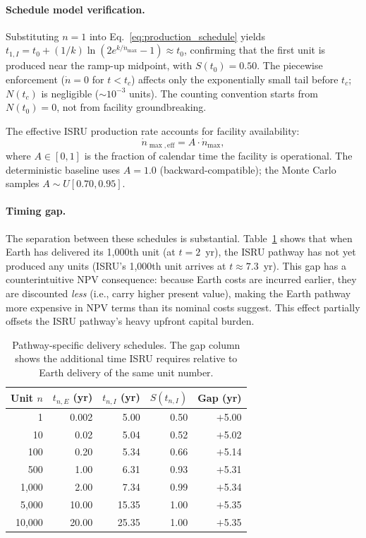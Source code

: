 \documentclass[preprint,12pt]{elsarticle}
\begin{document}
\paragraph{Schedule model verification.} Substituting $n = 1$ into Eq.~\ref{eq:production_schedule} yields $t_{1,I} = t_0 + (1/k)\ln(2e^{k/\dot{n}_{\max}} - 1) \approx t_0$, confirming that the first unit is produced near the ramp-up midpoint, with $S(t_0) = 0.50$. The piecewise enforcement ($\dot{n} = 0$ for $t < t_c$) affects only the exponentially small tail before $t_c$; $N(t_c)$ is negligible (${\sim}10^{-3}$ units). The counting convention starts from $N(t_0) = 0$, not from facility groundbreaking.

The effective ISRU production rate accounts for facility availability:
\begin{equation}
  \dot{n}_{\max,\mathrm{eff}} = A \cdot \dot{n}_{\max},
  \label{eq:availability}
\end{equation}
where $A \in [0,1]$ is the fraction of calendar time the facility is operational. The deterministic baseline uses $A = 1.0$ (backward-compatible); the Monte Carlo samples $A \sim U[0.70, 0.95]$.

\paragraph{Timing gap.} The separation between these schedules is substantial. Table~\ref{tab:production_schedule} shows that when Earth has delivered its 1{,}000th unit (at $t = 2$~yr), the ISRU pathway has not yet produced any units (ISRU's 1{,}000th unit arrives at $t \approx 7.3$~yr). This gap has a counterintuitive NPV consequence: because Earth costs are incurred earlier, they are discounted \emph{less} (i.e., carry higher present value), making the Earth pathway more expensive in NPV terms than its nominal costs suggest. This effect partially offsets the ISRU pathway's heavy upfront capital burden.

\begin{table}[htbp]
\centering
\caption{Pathway-specific delivery schedules. The gap column shows the additional time ISRU requires relative to Earth delivery of the same unit number.}
\label{tab:production_schedule}
\small
\begin{tabular}{@{}rrrrr@{}}
\toprule
Unit $n$ & $t_{n,E}$ (yr) & $t_{n,I}$ (yr) & $S(t_{n,I})$ & Gap (yr) \\
\midrule
1      & 0.002 & 5.00  & 0.50 & $+$5.00 \\
10     & 0.02  & 5.04  & 0.52 & $+$5.02 \\
100    & 0.20  & 5.34  & 0.66 & $+$5.14 \\
500    & 1.00  & 6.31  & 0.93 & $+$5.31 \\
1{,}000  & 2.00  & 7.34  & 0.99 & $+$5.34 \\
5{,}000  & 10.00 & 15.35 & 1.00 & $+$5.35 \\
10{,}000 & 20.00 & 25.35 & 1.00 & $+$5.35 \\
\bottomrule
\end{tabular}
\end{table}
\end{document}
